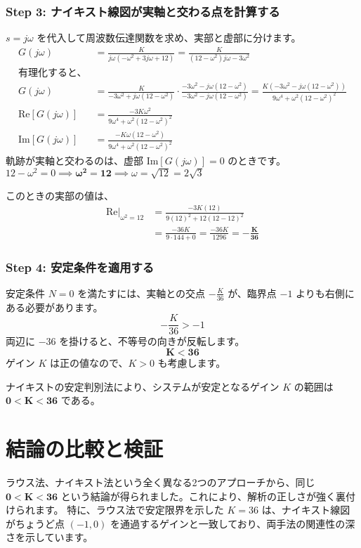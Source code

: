 \documentclass[11pt,a4paper]{ltjsarticle}
\begin{document}
\subsubsection{Step 3: ナイキスト線図が実軸と交わる点を計算する}
$s=j\omega$ を代入して周波数伝達関数を求め、実部と虚部に分けます。
\begin{align*}
G(j\omega) &= \frac{K}{j\omega(-\omega^2+3j\omega+12)} = \frac{K}{(12-\omega^2)j\omega - 3\omega^2}\\
\text{有理化すると、}& \\
G(j\omega) &= \frac{K}{-3\omega^2 + j\omega(12-\omega^2)} \cdot \frac{-3\omega^2 - j\omega(12-\omega^2)}{-3\omega^2 - j\omega(12-\omega^2)} = \frac{K(-3\omega^2 - j\omega(12-\omega^2))}{9\omega^4 + \omega^2(12-\omega^2)^2} \\
\text{Re}[G(j\omega)] &= \frac{-3K\omega^2}{9\omega^4 + \omega^2(12-\omega^2)^2} \\
\text{Im}[G(j\omega)] &= \frac{-K\omega(12-\omega^2)}{9\omega^4 + \omega^2(12-\omega^2)^2}
\end{align*}
軌跡が実軸と交わるのは、虚部 $\text{Im}[G(j\omega)]=0$ のときです。
$12-\omega^2 = 0 \implies \bm{\omega^2 = 12} \implies \omega = \sqrt{12} = 2\sqrt{3}$

このときの実部の値は、
\begin{align*}
\text{Re}|_{\omega^2=12} &= \frac{-3K(12)}{9(12)^2 + 12(12-12)^2} \\
&= \frac{-36K}{9 \cdot 144 + 0} = \frac{-36K}{1296} = \bm{-\frac{K}{36}}
\end{align*}

\subsubsection{Step 4: 安定条件を適用する}
安定条件 $N=0$ を満たすには、実軸との交点 $-\frac{K}{36}$ が、臨界点 $-1$ よりも右側にある必要があります。
$$-\frac{K}{36} > -1$$
両辺に $-36$ を掛けると、不等号の向きが反転します。
$$\bm{K < 36}$$
ゲイン $K$ は正の値なので、$K>0$ も考慮します。

\begin{tcolorbox}[title=ナイキスト法による結論, colback=yellow!10!white, colframe=yellow!75!black]
    ナイキストの安定判別法により、システムが安定となるゲイン $K$ の範囲は $\mathbf{0 < K < 36}$ である。
\end{tcolorbox}

\section{結論の比較と検証}
ラウス法、ナイキスト法という全く異なる2つのアプローチから、同じ $\mathbf{0 < K < 36}$ という結論が得られました。これにより、解析の正しさが強く裏付けられます。
特に、ラウス法で安定限界を示した $K=36$ は、ナイキスト線図がちょうど点 $(-1,0)$ を通過するゲインと一致しており、両手法の関連性の深さを示しています。
\end{document}
